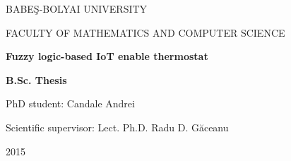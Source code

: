 \documentclass[a4paper, 12pt, english]{report}
\begin{document}
\begin{titlepage}
\sloppy
\begin{center}
\Large{BABE\c{S}-BOLYAI UNIVERSITY}

\Large{FACULTY OF MATHEMATICS AND COMPUTER SCIENCE}



\vspace{8cm}
\Huge \textbf{Fuzzy logic-based IoT enable thermostat}

\vspace{1.3cm}
\Large \textbf{B.Sc. Thesis}
\end{center}
\vspace{4cm}
\begin{flushright}
\Large{PhD student: Candale Andrei}

\Large{Scientific supervisor: Lect. Ph.D. Radu D. G\u{a}ceanu}

\end{flushright}

\vspace{2cm}

\begin{center}
\Large{2015}
\end{center}

\end{titlepage}




\tableofcontents
\listoffigures
\listoftables














\renewcommand\bibname{Bibliography}

%
%


\end{document}

